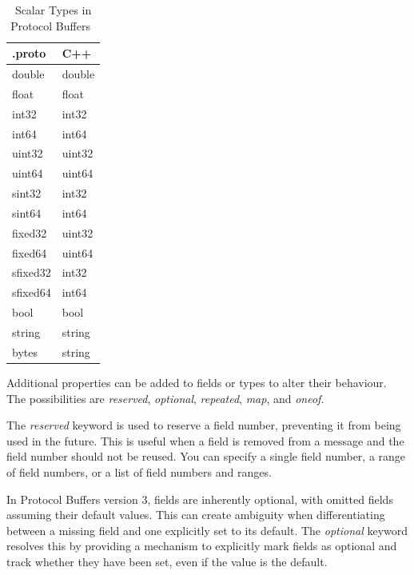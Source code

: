 \begin{table}[hbt!]
    \centering
    \captionsetup{justification=centering}
    \begin{tabular}{|l|l|}
        \hline
        .proto   & C++    \\ \hline
        double   & double \\ \hline
        float    & float  \\ \hline
        int32    & int32  \\ \hline
        int64    & int64  \\ \hline
        uint32   & uint32 \\ \hline
        uint64   & uint64 \\ \hline
        sint32   & int32  \\ \hline
        sint64   & int64  \\ \hline
        fixed32  & uint32 \\ \hline
        fixed64  & uint64 \\ \hline
        sfixed32 & int32  \\ \hline
        sfixed64 & int64  \\ \hline
        bool     & bool   \\ \hline
        string   & string \\ \hline
        bytes    & string \\ \hline
    \end{tabular}
    \caption{Scalar Types in Protocol Buffers~\cite{protobuf-proto3}}
    \label{tab:protobuf-scalar-types}
\end{table}


Additional properties can be added to fields or types to alter their behaviour.
The possibilities are \textit{reserved}, \textit{optional}, \textit{repeated}, \textit{map}, and \textit{oneof}.
\cite{protobuf-proto3}

The \textit{reserved} keyword is used to reserve a field number, preventing it from being used in the future.
This is useful when a field is removed from a message and the field number should not be reused.
You can specify a single field number, a range of field numbers, or a list of field numbers and ranges.
\cite{protobuf-proto3}

In Protocol Buffers version 3, fields are inherently optional, with omitted fields assuming their default values.
This can create ambiguity when differentiating between a missing field and one explicitly set to its default.
The \textit{optional} keyword resolves this by providing a mechanism to explicitly mark fields as optional and track whether they have been set, even if the value is the default.
\cite{protobuf-proto3}

